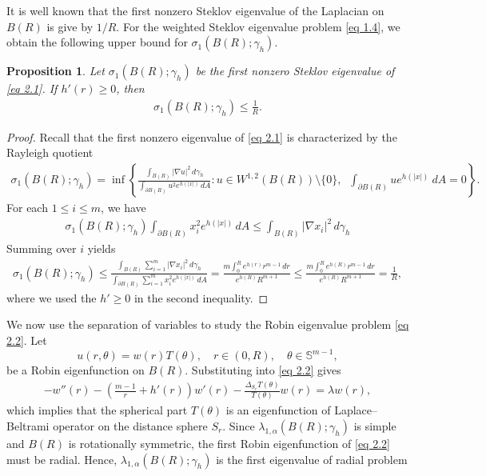 \documentclass[11pt,leqno]{amsart}
\newtheorem{proposition}{Proposition}[section]
\def\a{\alpha}
\def\l{\lambda}
\numberwithin{equation}{section}
\begin{document}
It is well known that the first nonzero Steklov eigenvalue of  the Laplacian on $B(R)$ is give by $1/R$. For the weighted Steklov eigenvalue problem \eqref{eq 1.4}, we obtain the following upper bound for $\sigma_1(B(R); \gamma_h)$.
\begin{proposition}
      Let $\sigma_1(B(R); \gamma_h)$ be the first nonzero Steklov eigenvalue of  \eqref{eq 2.1}. If $h'(r)\ge 0$, then 
 \begin{align}\label{eq 2.3}
\sigma_1(B(R); \gamma_h)\le \frac 1 R.
 \end{align}   
\end{proposition}
\begin{proof}
Recall that the first nonzero eigenvalue of \eqref{eq 2.1} is characterized by the  Rayleigh quotient
\begin{align*}
\sigma_1(B(R);\gamma_h)=\inf\left\{ \frac{\int_{B(R)} |\nabla u|^2 \, d\gamma_h}{\int_{\partial B(R)}  u^2 e^{h(|x|)}\, dA} : u\in W^{1,2}(B(R))\setminus\{0\},\;\; \int_{\partial B(R)} ue^{h(|x|)}\ dA=0 \right\}.
\end{align*}
For each $1\le i\le m$, we have 
\begin{align*}
\sigma_1(B(R); \gamma_h) \int_{\partial B(R) }  x_i^2 e^{h(|x|)}\, dA   \le  \int_{B(R)} |\nabla x_i|^2 \, d\gamma_h
\end{align*}
 Summing  over $i$ yields
\begin{align*}
  \sigma_1(B(R); \gamma_h)  \le  \frac{\int_{B(R)} \sum_{i=1}^m|\nabla x_i|^2\, d\gamma_h}{\int_{\partial B(R) }  \sum_{i=1}^m x_i^2 e^{h(|x|)}\, dA}=\frac{m\int_0^R e^{h(r)} r^{m-1}\, dr}{e^{h(R)}R^{m+1}}\le\frac{m\int_0^R e^{h(R)} r^{m-1}\, dr}{e^{h(R)}R^{m+1}}=\frac 1 R,
\end{align*}
where we used the $h'\ge 0$ in the second inequality. 
\end{proof}
We now use the  separation of variables to study the Robin eigenvalue problem \eqref{eq 2.2}. Let
$$
u(r, \theta) = w(r) T(\theta), \quad r\in (0, R), \quad \theta\in \mathbb{S}^{m-1},
$$
be a Robin eigenfunction on $B(R)$. Substituting into  \eqref{eq 2.2}  gives
\begin{align*}
-w''(r)-(\frac {m-1} r+h'(r)) w'(r)-\frac{\Delta_{S_r}T(\theta)}{T(\theta)} w(r)=\l w(r), 
\end{align*}
which implies that the spherical part $T(\theta)$ is an eigenfunction of Laplace–Beltrami operator on the distance sphere $S_r$.
Since $\l_{1, \a}(B(R); \gamma_h)$ is simple and $B(R)$ is rotationally symmetric, the first Robin eigenfunction of \eqref{eq 2.2} must be radial. Hence, $\l_{1, \a}(B(R);\gamma_h)$ is the first eigenvalue of radial problem
\end{document}
